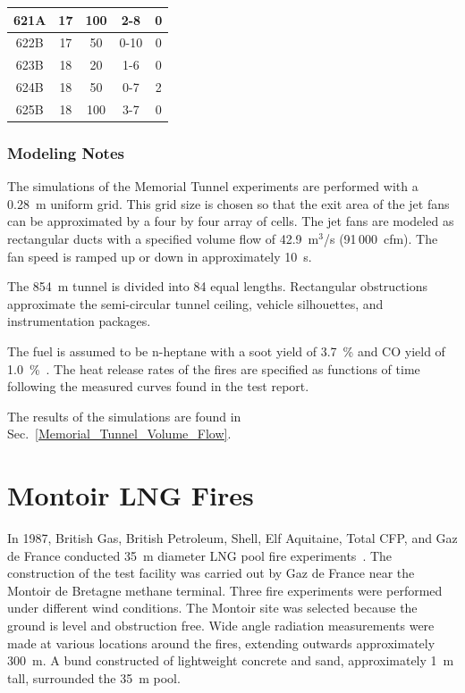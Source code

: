 \begin{table}[!ht]
\begin{center}
\begin{tabular}{|c|c|c|c|c|}
621A     & 17       & 100           & 2-8      & 0           \\ \hline
622B     & 17       & 50            & 0-10     & 0           \\ \hline
623B     & 18       & 20            & 1-6      & 0           \\ \hline
624B     & 18       & 50            & 0-7      & 2           \\ \hline
625B     & 18       & 100           & 3-7      & 0           \\ \hline
\end{tabular}
\end{center}
\label{tab:Memorial_Test_Matrix}
\end{table}


\subsubsection{Modeling Notes}

The simulations of the Memorial Tunnel experiments are performed with a 0.28~m uniform grid. This grid size is chosen so that the exit area of the jet fans can be approximated by a four by four array of cells. The jet fans are modeled as rectangular ducts with a specified volume flow of 42.9~m$^3$/s (91\,000~cfm). The fan speed is ramped up or down in approximately 10~s.

The 854~m tunnel is divided into 84 equal lengths. Rectangular obstructions approximate the semi-circular tunnel ceiling, vehicle silhouettes, and instrumentation packages.

The fuel is assumed to be n-heptane with a soot yield of 3.7~\% and CO yield of 1.0~\%~\cite{SFPE:Tewarson}. The heat release rates of the fires are specified as functions of time following the measured curves found in the test report.

The results of the simulations are found in Sec.~\ref{Memorial_Tunnel_Volume_Flow}.


\section{Montoir LNG Fires}
\label{Montoir_LNG_Fires_Description}

In 1987, British Gas, British Petroleum, Shell, Elf Aquitaine, Total CFP, and Gaz de France conducted 35~m diameter LNG pool fire experiments~\cite{Nedelka:1990}. The construction of the test facility was carried out by Gaz de France near the Montoir de Bretagne methane terminal. Three fire experiments were performed under different wind conditions. The Montoir site was selected because the ground is level and obstruction free. Wide angle radiation measurements were made at various locations around the fires, extending outwards approximately 300~m. A bund constructed of lightweight concrete and sand, approximately 1~m tall, surrounded the 35~m pool.


